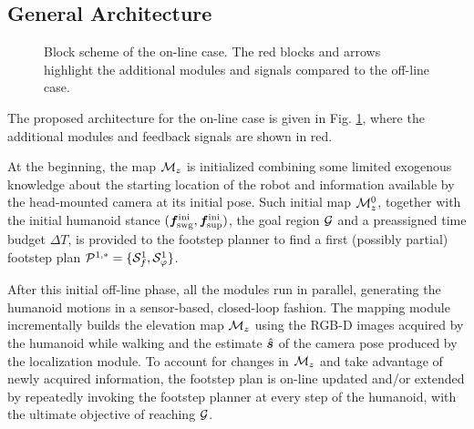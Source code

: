 \subsection{General Architecture}
\label{sec:onlineCase:GeneralArchitecture}
\begin{figure}
\BlockSchemeOnline
\caption{Block scheme of the on-line case. The red blocks and arrows highlight the additional modules and signals compared to the off-line case.}
\label{fig:blockScheme2}
\end{figure}

The proposed architecture for the on-line case is given in Fig. \ref{fig:blockScheme2}, where the additional modules and feedback signals are shown in red.

At the beginning, the map ${\cal M}_z$ is initialized combining some limited exogenous knowledge about the starting location of the robot and information available by the head-mounted camera at its initial pose. Such initial map ${\cal M}_z^0$, together with the initial humanoid stance $({\bm{f}}_{\rm swg}^{\rm ini}, {\bm{f}}_{\rm sup}^{\rm ini})$, the goal region $\cal G$ and a preassigned time budget $\Delta T$, is provided to the footstep planner to find a first (possibly partial) footstep plan ${\cal P}^{1,*} = \{ {\cal S}_f^{1}, {\cal S}_\varphi^{1} \}$.

After this initial off-line phase, all the modules run in parallel, generating the humanoid motions in a sensor-based, closed-loop fashion.
%
The mapping module incrementally builds the elevation map ${\cal M}_z$ using the RGB-D images acquired by the humanoid while walking and the estimate $\hat{{\bm{s}}}$ of the camera pose produced by the localization module.
To account for changes in ${\cal M}_z$ and take advantage of newly acquired information, the footstep plan is on-line updated and/or extended by repeatedly invoking the footstep planner at every step of the humanoid, with the ultimate objective of reaching $\cal G$. 

